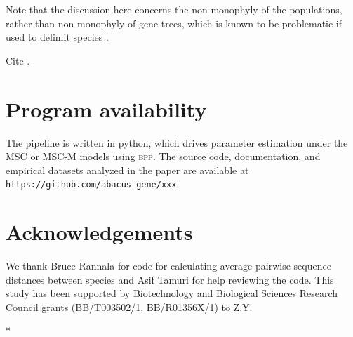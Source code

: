 \documentclass{article1}
\begin{document}
Note that the discussion here concerns the non-monophyly of the populations, rather than
non-monophyly of gene trees, which is known to be problematic if used to delimit species
\cite{Knowles2007}.

Cite \citet{Sukumaran2021, Solis-Lemus2015}.  


\section{Program availability}

The pipeline is written in python, which drives parameter estimation under the MSC or
MSC-M models using \textsc{bpp}.  The source code, documentation, and empirical datasets
analyzed in the paper are available at \texttt{\small https://github.com/abacus-gene/xxx}.

\section{Acknowledgements} 

We thank Bruce Rannala for code for calculating average pairwise sequence distances
between species and Asif Tamuri for help reviewing the code.  This study has been
supported by Biotechnology and Biological Sciences Research Council grants (BB/T003502/1,
BB/R01356X/1) to Z.Y.


\renewcommand{\bibfont}{\scriptsize}



\newpage
\FloatBarrier %
\setcounter{table}{0} %
\setcounter{figure}{0} %
\renewcommand{\thetable}{S\arabic{table}} %
\renewcommand{\thefigure}{S\arabic{figure}} %

\newpage
*
\newpage
\end{document}
